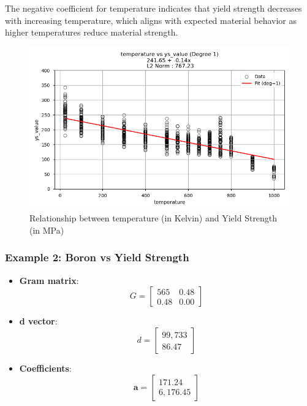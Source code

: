 \documentclass[10pt]{article}
\begin{document}
The negative coefficient for temperature indicates that yield strength decreases with increasing temperature, which aligns with expected material behavior as higher temperatures reduce material strength.

\begin{figure}[H]
    \centering
    \includegraphics[width=\imagewidthone\textwidth]{figures/03_leastsq/temperature_vs_ys_value_deg1.png}
    \caption{Relationship between temperature (in Kelvin) and Yield Strength (in MPa)}
\end{figure}


\newpage
\subsubsection{Example 2: Boron vs Yield Strength}
\begin{itemize}
    \item \textbf{Gram matrix}:
    \[
    G = \begin{bmatrix}
    565 & 0.48 \\
    0.48 & 0.00
    \end{bmatrix}
    \]
    \item \textbf{d vector}:
    \[
    d = \begin{bmatrix}
    99,733 \\
    86.47
    \end{bmatrix}
    \]
    \item \textbf{Coefficients}:
    \[
    \mathbf{a} = \begin{bmatrix}
    171.24 \\
    6,176.45
    \end{bmatrix}
    \]
\end{itemize}
\end{document}
